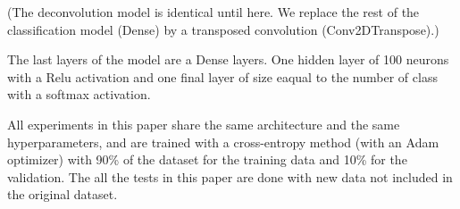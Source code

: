\documentclass[11pt,a4paper]{article}
\begin{document}
(The deconvolution model is identical until here. We replace the rest of the classification model (Dense) by a transposed convolution (Conv2DTranspose).)

The last layers of the model are a Dense layers. One hidden layer of 100 neurons with a Relu activation and one final layer of size eaqual to the number of class with a softmax activation.

All experiments in this paper share the same architecture and the same hyperparameters, and are trained with a cross-entropy method (with an Adam optimizer) with 90\% of the dataset for the training data and 10\% for the validation. The all the tests in this paper are done with new data not included in the original dataset.
\end{document}
